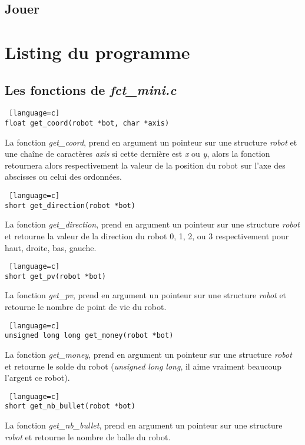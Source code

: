 \documentclass[a4paper, 11pt]{article}
\begin{document}
\subsection{Jouer}

\newpage
\section{Listing du programme}
\subsection{Les fonctions de \emph{fct\_mini.c}}
\begin {lstlisting} [language=c]
float get_coord(robot *bot, char *axis)
\end{lstlisting}
La fonction \emph{get\_coord}, prend en argument un pointeur sur une structure \emph{robot} et une chaîne de caractères \emph{axis} si cette dernière est \emph{x} ou \emph{y}, alors la fonction retournera alors respectivement la valeur de la position du robot sur l'axe des abscisses ou celui des ordonnées.\\

\begin {lstlisting} [language=c]
short get_direction(robot *bot)
\end{lstlisting}
La fonction \emph{get\_direction}, prend en argument un pointeur sur une structure \emph{robot} et retourne la valeur de la direction du robot 0, 1, 2, ou 3 respectivement pour haut, droite, bas, gauche.\\

\begin {lstlisting} [language=c]
short get_pv(robot *bot)
\end{lstlisting}
La fonction \emph{get\_pv}, prend en argument un pointeur sur une structure \emph{robot} et retourne le nombre de point de vie du robot.\\

\begin {lstlisting} [language=c]
unsigned long long get_money(robot *bot)
\end{lstlisting}
La fonction \emph{get\_money}, prend en argument un pointeur sur une structure \emph{robot} et retourne le solde du robot (\emph{unsigned long long}, il aime vraiment beaucoup l'argent ce robot).\\

\begin {lstlisting} [language=c]
short get_nb_bullet(robot *bot)
\end{lstlisting}
La fonction \emph{get\_nb\_bullet}, prend en argument un pointeur sur une structure \emph{robot} et retourne le nombre de balle du robot.\\
\end{document}
